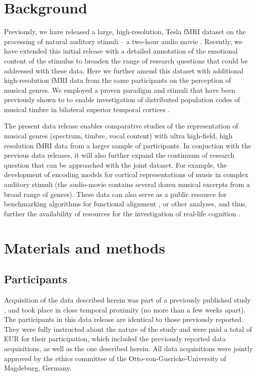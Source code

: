 \section*{Background}


Previously, we have released a large, high-resolution, \unit[7]{Tesla} fMRI
dataset on the processing of natural auditory stimuli -- a two-hour audio movie
\cite{HBI+14}.  Recently, we have extended this initial release with a detailed
annotation of the emotional content of the stimulus \cite{LRS+2015} to broaden
the range of research questions that could be addressed with these data.  Here
we further amend this dataset with additional high-resolution fMRI data from
the same participants on the perception of musical genres.  We employed a
proven paradigm and stimuli that have been previously shown to to enable
investigation of distributed population codes of musical timbre in bilateral
superior temporal cortices \cite{CTK+2012}. 

The present data release enables comparative studies of the representation of
musical genres (spectrum, timbre, vocal content) with ultra high-field, high
resolution fMRI data from a larger sample of participants. In conjuction with
the previous data releases, it will also further expand the continuum of
research question that can be approached with the joint dataset. For example, the
development of encoding models for cortical representations of music in complex
auditory stimuli (the audio-movie contains several dozen musical excerpts from
a broad range of genres).  These data can also serve as a public resource for
benchmarking algorithms for functional alignment \cite[e.g., ][]{HGC+11}, or
other analyses, and thus, further the availability of resources for the
investigation of real-life cognition \cite{HH2015}.

\section*{Materials and methods}
\subsection*{Participants}

Acquisition of the data described herein was part of a previously published
study \cite{HBI+14}, and took place in close temporal proximity (no more
than a few weeks apart). The participants in this data release are identical to
those previously reported.  They were fully instructed about
the nature of the study and were paid a total of \unit[100]{EUR} for their
participation, which included the previously reported data acquisitions, as
well as the one described herein. All data acquisitions were jointly approved
by the ethics committee of the Otto-von-Guericke-University of Magdeburg,
Germany.


